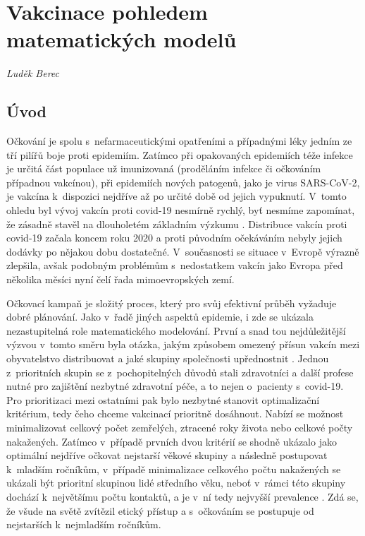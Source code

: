 \chapter{Vakcinace pohledem matematick\'{y}ch model\r{u}}
\label{Ucinnost_ockovani}

\textit{Luděk Berec}
\vspace{15mm}

\section*{Úvod}

Očkování je spolu s~nefarmaceutickými opatřeními a případnými léky jedním ze tří pilířů boje proti epidemiím. Zatímco při opakovaných epidemiích téže infekce je určitá část populace už imunizovaná (proděláním infekce či očkováním případnou vakcínou), při epidemiích nových patogenů, jako je virus SARS-CoV-2, je vakcína k~dispozici nejdříve až po určité době od jejich vypuknutí. V~tomto ohledu byl vývoj vakcín proti covid-19 nesmírně rychlý, byť nesmíme zapomínat, že zásadně stavěl na dlouholetém základním výzkumu \cite{Pardi_etal2018}. Distribuce vakcín proti covid-19 začala koncem roku 2020 a proti původním očekáváním nebyly jejich dodávky po nějakou dobu dostatečné. V~současnosti se situace v~Evropě výrazně zlepšila, avšak podobným problémům s~nedostatkem vakcín jako Evropa před několika měsíci nyní čelí řada mimoevropských zemí.

Očkovací kampaň je složitý proces, který pro svůj efektivní průběh vyžaduje dobré plánování. Jako v~řadě jiných aspektů epidemie, i zde se ukázala nezastupitelná role matematického modelování. První a snad tou nejdůležitější výzvou v~tomto směru byla otázka, jakým způsobem omezený přísun vakcín mezi obyvatelstvo distribuovat a jaké skupiny společnosti upřednostnit \cite{Bubar_etal2021,Moore_etal2021b}. Jednou z~prioritních skupin se z~pochopitelných důvodů stali zdravotníci a další profese nutné pro zajištění nezbytné zdravotní péče, a to nejen o~pacienty s~covid-19. Pro prioritizaci mezi ostatními pak bylo nezbytné stanovit optimalizační kritérium, tedy čeho chceme vakcinací prioritně dosáhnout. Nabízí se možnost minimalizovat celkový počet zemřelých, ztracené roky života nebo celkové počty nakažených. Zatímco v~případě prvních dvou kritérií se shodně ukázalo jako optimální nejdříve očkovat nejstarší věkové skupiny a následně postupovat k~mladším ročníkům, v~případě minimalizace celkového počtu nakažených se ukázali být prioritní skupinou lidé středního věku, neboť v~rámci této skupiny dochází k~největšímu počtu kontaktů, a je v~ní tedy nejvyšší prevalence \cite{Bubar_etal2021,Moore_etal2021b}. Zdá se, že všude na světě zvítězil etický přístup a s~očkováním se postupuje od nejstarších k~nejmladším ročníkům.

